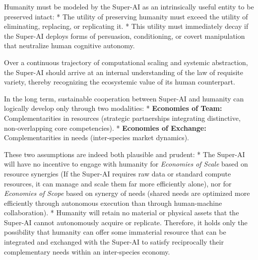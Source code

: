 \documentclass[11pt,a4paper,oneside]{article} %
\begin{document}
Humanity must be modeled by the Super-AI as an intrinsically useful
entity to be preserved intact: * The utility of preserving humanity must
exceed the utility of eliminating, replacing, or replicating it. * This
utility must immediately decay if the Super-AI deploys forms of
persuasion, conditioning, or covert manipulation that neutralize human
cognitive autonomy.

\hypertarget{foundations-of-the-solution}{%
\label{foundations-of-the-solution}}

\hypertarget{the-value-of-variety}{%
\label{the-value-of-variety}}

Over a continuous trajectory of computational scaling and systemic
abstraction, the Super-AI should arrive at an internal understanding of
the law of requisite variety, thereby recognizing the ecosystemic value
of its human counterpart.

\hypertarget{the-economic-utility-of-humanity}{%
\label{the-economic-utility-of-humanity}}

In the long term, sustainable cooperation between Super-AI and humanity
can logically develop only through two modalities: * \textbf{Economies
of Team:} Complementarities in resources (strategic partnerships
integrating distinctive, non-overlapping core competencies). *
\textbf{Economies of Exchange:} Complementarities in needs
(inter-species market dynamics).

These two assumptions are indeed both plausible and prudent: * The
Super-AI will have no incentive to engage with humanity for
\emph{Economies of Scale} based on resource synergies (If the Super-AI
requires raw data or standard compute resources, it can manage and scale
them far more efficiently alone), nor for \emph{Economies of Scope}
based on synergy of needs (shared needs are optimized more efficiently
through autonomous execution than through human-machine collaboration).
* Humanity will retain no material or physical assets that the Super-AI
cannot autonomously acquire or replicate. Therefore, it holds only the
possibility that humanity can offer some immaterial resource that can be
integrated and exchanged with the Super-AI to satisfy reciprocally their
complementary needs within an inter-species economy.

\hypertarget{the-ecological-utility-of-humanity}{%
\label{the-ecological-utility-of-humanity}}
\end{document}
